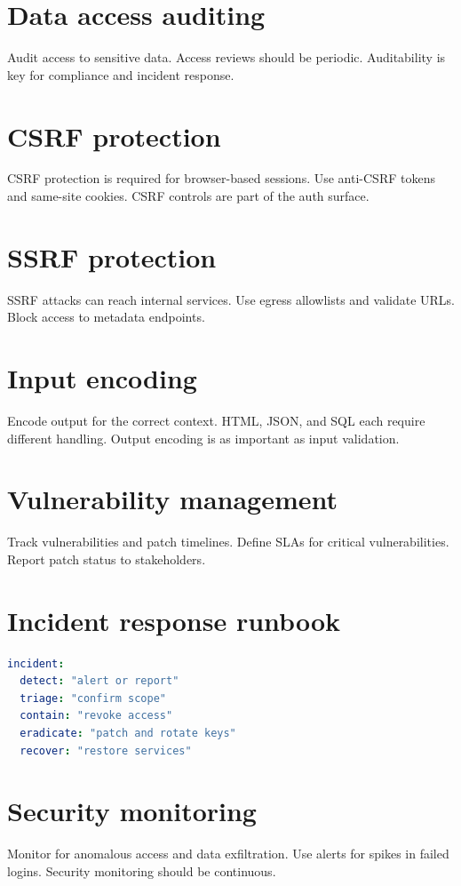 \section{Data access auditing}
Audit access to sensitive data.
Access reviews should be periodic.
Auditability is key for compliance and incident response.

\section{CSRF protection}
CSRF protection is required for browser-based sessions.
Use anti-CSRF tokens and same-site cookies.
CSRF controls are part of the auth surface.

\section{SSRF protection}
SSRF attacks can reach internal services.
Use egress allowlists and validate URLs.
Block access to metadata endpoints.

\section{Input encoding}
Encode output for the correct context.
HTML, JSON, and SQL each require different handling.
Output encoding is as important as input validation.

\section{Vulnerability management}
Track vulnerabilities and patch timelines.
Define SLAs for critical vulnerabilities.
Report patch status to stakeholders.

\section{Incident response runbook}
\begin{lstlisting}[language=YAML]
incident:
  detect: "alert or report"
  triage: "confirm scope"
  contain: "revoke access"
  eradicate: "patch and rotate keys"
  recover: "restore services"
\end{lstlisting}

\section{Security monitoring}
Monitor for anomalous access and data exfiltration.
Use alerts for spikes in failed logins.
Security monitoring should be continuous.

